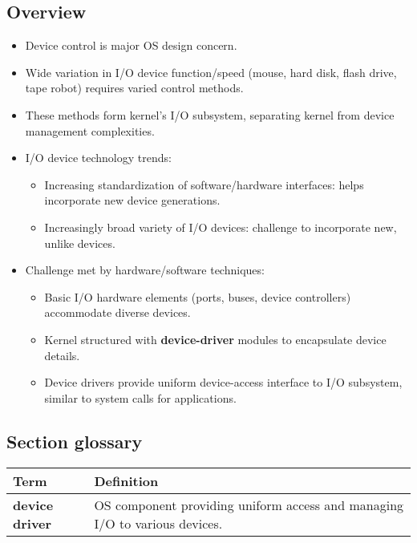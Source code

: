 \subsection{Overview}
\begin{itemize}
    \item Device control is major OS design concern.
    \item Wide variation in I/O device function/speed (mouse, hard disk, flash drive, tape robot) requires varied control methods.
    \item These methods form kernel's I/O subsystem, separating kernel from device management complexities.
    \item I/O device technology trends:
    \begin{itemize}
        \item Increasing standardization of software/hardware interfaces: helps incorporate new device generations.
        \item Increasingly broad variety of I/O devices: challenge to incorporate new, unlike devices.
    \end{itemize}
    \item Challenge met by hardware/software techniques:
    \begin{itemize}
        \item Basic I/O hardware elements (ports, buses, device controllers) accommodate diverse devices.
        \item Kernel structured with \textbf{device-driver} modules to encapsulate device details.
        \item Device drivers provide uniform device-access interface to I/O subsystem, similar to system calls for applications.
    \end{itemize}
\end{itemize}

\subsection{Section glossary}
\begin{tabular}{p{}p{}}
    \toprule
    \textbf{Term} & \textbf{Definition} \\
    \midrule
    \textbf{device driver} & OS component providing uniform access and managing I/O to various devices. \\
    \bottomrule
\end{tabular}
